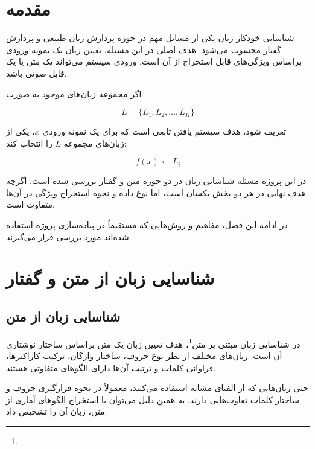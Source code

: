 \documentclass[12pt,a4paper,oneside]{report}
\begin{document}
\section{مقدمه}

شناسایی خودکار زبان یکی از مسائل مهم در حوزه پردازش زبان طبیعی و پردازش گفتار محسوب می‌شود. هدف اصلی در این مسئله، تعیین زبان یک نمونه ورودی براساس ویژگی‌های قابل استخراج از آن است. ورودی سیستم می‌تواند یک متن یا یک فایل صوتی باشد.

اگر مجموعه زبان‌های موجود به صورت

\begin{equation}
L=\{L_1,L_2,\ldots,L_K\}
\end{equation}

تعریف شود، هدف سیستم یافتن تابعی است که برای یک نمونه ورودی $x$، یکی از زبان‌های مجموعه $L$ را انتخاب کند:

\begin{equation}
f(x)\longleftarrow L_i
\end{equation}

در این پروژه مسئله شناسایی زبان در دو حوزه متن و گفتار بررسی شده است. اگرچه هدف نهایی در هر دو بخش یکسان است، اما نوع داده و نحوه استخراج ویژگی در آن‌ها متفاوت است.

در ادامه این فصل، مفاهیم و روش‌هایی که مستقیماً در پیاده‌سازی پروژه استفاده شده‌اند مورد بررسی قرار می‌گیرند.


\section{شناسایی زبان از متن و گفتار}

\subsection{شناسایی زبان از متن}

در شناسایی زبان مبتنی بر متن\footnote{}، هدف تعیین زبان یک متن براساس ساختار نوشتاری آن است. زبان‌های مختلف از نظر نوع حروف، ساختار واژگان، ترکیب کاراکترها، فراوانی کلمات و ترتیب آن‌ها دارای الگوهای متفاوتی هستند.

حتی زبان‌هایی که از الفبای مشابه استفاده می‌کنند، معمولاً در نحوه قرارگیری حروف و ساختار کلمات تفاوت‌هایی دارند. به همین دلیل می‌توان با استخراج الگوهای آماری از متن، زبان آن را تشخیص داد.
\end{document}
